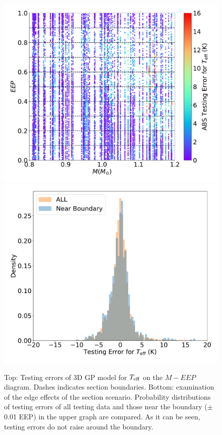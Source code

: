  \begin{figure}
	\includegraphics[width=1.0\columnwidth]{3d-testing_teff-10sections.pdf}
	\includegraphics[width=1.0\columnwidth]{3d-testing_teff-hist-10sections.pdf}	
    \caption{Top: Testing errors of 3D GP model for $T_{\rm eff}$ on the $M - EEP$ diagram. Dashes indicates section boundaries. Bottom: examination of the edge effects of the section scenario. Probability distributions of testing errors of all testing data and those near the boundary ($\pm$0.01 EEP) in the upper graph are compared.  As it can be seen, testing errors do not raise around the boundary. }  
    \label{fig:3dtest}
\end{figure}


